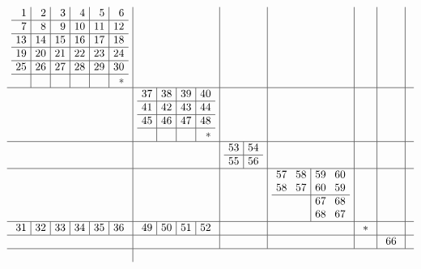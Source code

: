 \documentclass[12pt,a4paper]{amsart}
\begin{document}
\begin{align*}\arraycolsep4pt
\begin{array}{c|c|c|c|c|c|c}
\begin{array}{r|r|r|r|r|r}%
1&2&3&4&5&6\\\hline%
7&8&9&10&11&12\\\hline%
13&14&15&16&17&18\\\hline%
19&20&21&22&23&24\\\hline%
25&26&27&28&29&30\\\hline%
  &  &  &  &  &*\\%
\end{array}%
&&&&&&
\\\hline
&
\begin{array}{r|r|r|r}%
37&38&39&40\\\hline%
41&42&43&44\\\hline%
45&46&47&48\\\hline%
  &  &  & *\\%
\end{array}%
&&&&&
\\\hline
&&
\begin{array}{r|r}%
53&54\\\hline%
55&56\\%
\end{array}%
&&&&
\\\hline
&&&
\begin{array}{rr|rr}%
57&58&59&60\\%
58&57&60&59\\\hline%
  &  &67&68\\%
  &  &68&67\\%
\end{array}%
&&&
\\\hline
\begin{array}{r|r|r|r|r|r}%
31&32&33&34&35&36\\%
\end{array}%
&
\begin{array}{r|r|r|r}%
49&50&51&52\\%
\end{array}%
&&&
\begin{array}{r}%
 *\\%
\end{array}%
&&
\\\hline
&&&&&
\begin{array}{r}%
66\\%
\end{array}%
&
\\\hline
\begin{array}{r|r|r|r|r|r}%

\end{array}
\end{array}
\end{align*}
\end{document}
